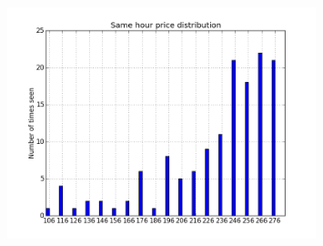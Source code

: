 \begin{figure}[h!]
\centering
\includegraphics[width=0.8\textwidth ,natwidth=410,natheight=237]{billeder/energy_price_plots/same_hour_distribution.png}
\caption{}
\label{fig:}
\end{figure}